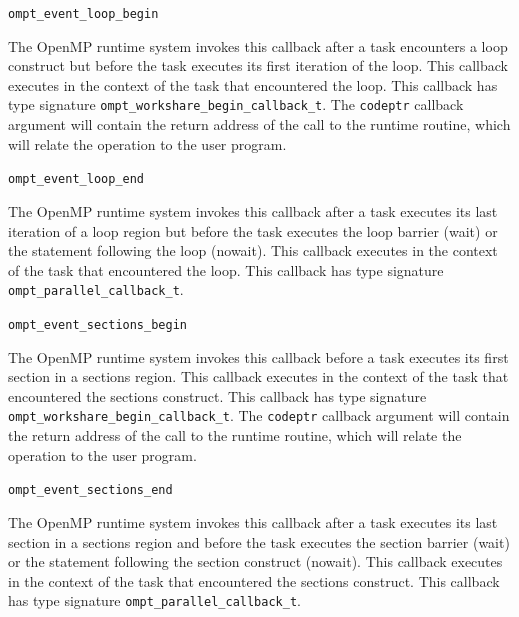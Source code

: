 \documentclass{article}
\newcommand{\descheader}[1]{{\needspace{3\baselineskip}\vspace{1em}\noindent \fbox{#1}}}
\begin{document}
\descheader{Loops}

\begin{description}
\sloppy
\item \verb|ompt_event_loop_begin|
 
  The OpenMP runtime system invokes this callback after a task encounters a loop construct
   but before the task
  executes its first  iteration of the loop. This callback executes in the
  context of the task that encountered the loop.
This callback has type signature \verb|ompt_workshare_begin_callback_t|. 
The \verb|codeptr| callback argument will contain the return address of the call to the runtime routine, which will relate the operation to the user program.

\item \verb|ompt_event_loop_end|
 
  The OpenMP runtime system invokes this callback after a task executes its last iteration of a loop region
  but before the task executes
  the loop barrier (wait) or the statement following the loop
  (nowait). This callback executes in the context of the task that encountered the loop.     %
This callback has type signature \verb|ompt_parallel_callback_t|. 
\end{description}

\descheader{Sections}

\begin{description}
\item \verb|ompt_event_sections_begin|
 
  The OpenMP runtime system invokes this callback before a task executes its first section in a sections region.
  This callback executes in the context of
  the task that encountered the sections construct.
  This callback has type signature \verb|ompt_workshare_begin_callback_t|.
  The \verb|codeptr| callback argument will contain the return address of the call to the runtime routine, which will relate the operation to the user program.

\item \verb|ompt_event_sections_end|

 \sloppy
  The OpenMP runtime system invokes this callback after a task executes  its last
  section in a sections region and before the task
  executes the section barrier (wait) or the statement following the
  section construct (nowait). This callback executes in the context
  of the task that encountered the sections construct.
This callback has type signature \verb|ompt_parallel_callback_t|. 

\end{description}
\end{document}
